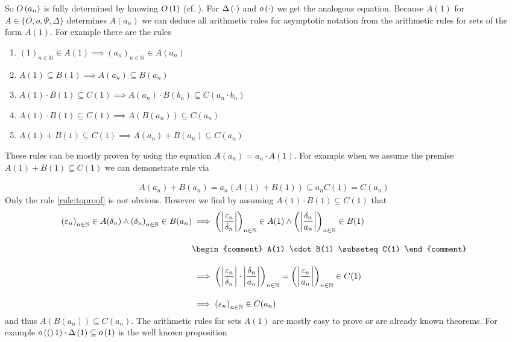 So $O\left( {a_n} \right)$ is fully determined by knowing $O\left( {1} \right)$ (cf. \cite{tampis:char}). For $\Delta\left( {\cdot} \right)$ and $o\left( {\cdot} \right)$ we get the analogous equation. Because $A(1)$ for $A\in\{O, o, \Psi, \Delta\}$ determines $A(a_n)$ we can deduce all arithmetic rules for asymptotic notation from the arithmetic rules for sets of the form $A(1)$. For example there are the rules \cite{tampis:rules}

\begin{enumerate}
  \item $(1)_{n\in\mathbb N} \in A(1) \implies (a_n)_{n\in\mathbb N} \in A(a_n)$
  \item $A(1) \subseteq B(1) \implies A(a_n) \subseteq B(a_n)$
  \item $A(1)\cdot B(1) \subseteq C(1) \implies A(a_n)\cdot B(b_n) \subseteq C(a_n\cdot b_n)$ \label{rule:example}
  \item $A(1)\cdot B(1) \subseteq C(1) \implies A(B(a_n)) \subseteq C(a_n)$ \label{rule:toproof}
  \item $A(1)+ B(1) \subseteq C(1) \implies A(a_n) + B(a_n) \subseteq C(a_n)$ \label{rule:demo}
\end{enumerate}

These rules can be mostly proven by using the equation $A(a_n) = a_n \cdot A(1)$. For example when we assume the premise $A(1) + B(1)\subseteq C(1)$ we can demonstrate rule \label{rule:demo} via

\begin{align}
  A(a_n) + B(a_n) = a_n (A(1)+B(1)) \subseteq a_n C(1) = C(a_n)
\end{align}
Only the rule \ref{rule:toproof} is not obvious. However we find by assuming $A(1) \cdot B(1) \subseteq C(1)$ that
\begin{align}
  \seq{\epsilon_n} \in A(\delta_n) \land \seq{\delta_n} \in B(a_n) & \implies \seq{\abs{\frac{\epsilon_n}{\delta_n}}} \in A(1) \land \seq{\abs{\frac{\delta_n}{a_n}}} \in B(1) \bnl
  &
  \begin{comment}
    A(1) \cdot B(1) \subseteq C(1)
  \end{comment} \bnl
  & \implies \seq{\abs{\frac{\epsilon_n}{\delta_n}} \cdot \abs{\frac{\delta_n}{a_n}}} = \seq{\abs{\frac{\epsilon_n}{a_n}}} \in C(1) \bnl
  & \implies \seq{\epsilon_n} \in C(a_n)
\end{align}
and thus $A(B(a_n))\subseteq C(a_n)$. The arithmetic rules for sets $A(1)$ are mostly easy to prove or are already known theorems. For example $o\left( {(} \right)1)\cdot\Delta\left( {1} \right) \subseteq o\left( {1} \right)$ is the well known proposition

